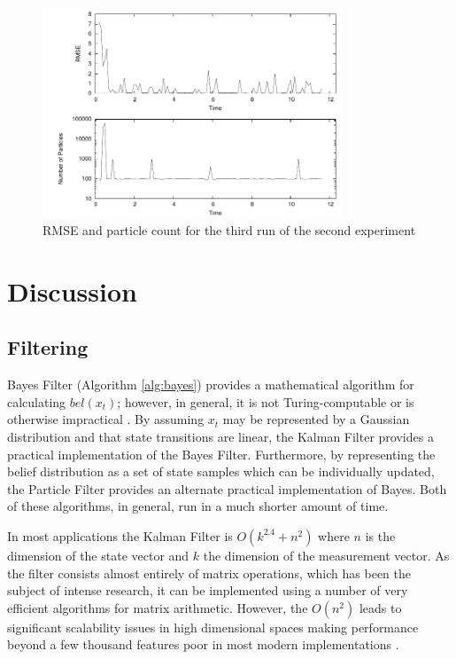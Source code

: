 \documentclass[english]{article}
\begin{document}
\begin{figure}[htp]
\centering
 \includegraphics[width=0.8\textwidth]{images/experiment2/res5_rmse_particles}
\caption{RMSE and particle count for the third run of the second experiment}
\label{fig:ex2res5}
\end{figure}
\pagebreak
\section{Discussion}
\subsection{Filtering}
Bayes Filter (Algorithm \ref{alg:bayes}) provides a mathematical algorithm for calculating $bel(x_t)$; however, in general, it is not Turing-computable or is otherwise impractical \cite{probrob}. By assuming $x_t$ may be represented by a Gaussian distribution and that state transitions are linear, the Kalman Filter provides a practical implementation of the Bayes Filter. Furthermore, by representing the belief distribution as a set of state samples which can be individually updated, the Particle Filter provides an alternate practical implementation of Bayes. Both of these algorithms, in general, run in a much shorter amount of time.

In most applications the Kalman Filter is $O(k^{2.4} + n^2)$ where $n$ is the dimension of the state vector and $k$ the dimension of the measurement vector\cite{probrob}. As the filter consists almost entirely of matrix operations, which has been the subject of intense research, it can be implemented using a number of very efficient algorithms for matrix arithmetic. However, the $O(n^2)$ leads to significant scalability issues in high dimensional spaces making performance beyond a few thousand features poor in most modern implementations \cite{Thrun02d}.
\end{document}
